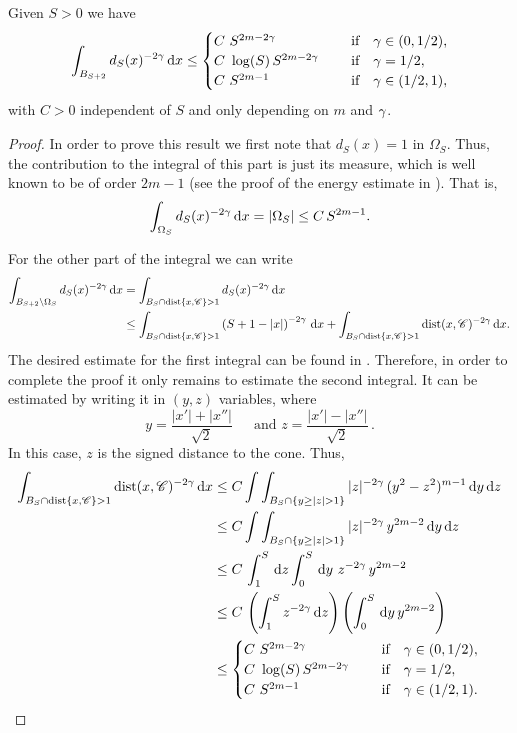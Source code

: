 \begin{lemma}
\label{Lemma:Integrability_dFunction}
Given $S>0$ we have
$$ \int_{B_{S+2}} d_S(x)^{-2\gamma} \,\mathrm{d} x \leq \begin{cases}
C \ S^{2m-2\gamma}\ \ \ \ &\textrm{if } \ \ \gamma\in(0,1/2),\\
C\ \log(S)\,S^{2m-2\gamma}\ \ \ \ &\textrm{if } \ \ \gamma=1/2,\\
C \ S^{2m-1}\ \ \ \ &\textrm{if } \ \ \gamma\in(1/2,1),\\
\end{cases} $$
with $C>0$ independent of $S$ and only depending on $m$ and $\gamma$.
\end{lemma}

\begin{proof}
In order to prove this result we first note that $d_S(x)=1$ in $\Omega_S$. Thus, the contribution to the integral of this part is just its measure, which is well known to be of order $2m-1$ (see the proof of the energy estimate in \cite{CabreTerraI}). That is,
$$\int_{\Omega_S} d_S(x)^{-2\gamma} \,\mathrm{d} x = |\Omega_S| \leq C\,S^{2m-1}.$$

For the other part of the integral we can write
\begin{align*}
\int_{B_{S+2}\setminus \Omega_S} d_S(x)^{-2\gamma} \,\mathrm{d} x &= \int_{B_{S}\cap \operatorname{dist}\{x,\mathscr{C}\}>1} d_S(x)^{-2\gamma} \,\mathrm{d} x \\
& \leq \int_{B_{S}\cap \operatorname{dist}\{x,\mathscr{C}\}>1} \left( S+1-|x| \right)^{-2\gamma} \,\mathrm{d} x + \int_{B_{S}\cap \operatorname{dist}\{x,\mathscr{C}\}>1} \operatorname{dist}(x,\mathscr{C})^{-2\gamma} \,\mathrm{d} x.
\end{align*}
The desired estimate for the first integral can be found in \cite{SavinValdinoci-EnergyEstimate}. Therefore, in order to complete the proof it only remains to estimate the second integral. It can be estimated by writing it in $(y,z)$ variables, where
$$
y = \dfrac{|x'|+|x''|}{\sqrt{2}} \, \quad \text{ and } z = \dfrac{|x'|-|x''|}{\sqrt{2}}\,.
$$
In this case, $z$ is the signed distance to the cone. Thus,
\begin{align*}
\int_{B_{S}\cap \dist\{x,\ccal\}>1} \dist(x,\ccal)^{-2\s} \d x &\leq C \int \int_{B_{S}\cap \{y\geq|z|>1\}} |z|^{-2\s} \, (y^2-z^2)^{m-1} \d y\d z \\
& \leq C \int \int_{B_{S}\cap \{y\geq|z|>1\}} |z|^{-2\s} \, y^{2m-2} \d y\d z \\
& \leq C\, \int_1^S \d z \int_0^S \d y\ z^{-2\s} \, y^{2m-2} \\
& \leq C\, \left(\int_1^S z^{-2\s} \d z \right)  \left(  \int_0^S \d y \, y^{2m-2} \right) \\
& \leq \begin{cases}
C \ S^{2m-2\s}\ \ \ \ &\textrm{if } \ \ \s\in(0,1/2),\\
C\ \log(S)\,S^{2m-2\s}\ \ \ \ &\textrm{if } \ \ \s=1/2,\\
C \ S^{2m-1}\ \ \ \ &\textrm{if } \ \ \s\in(1/2,1).\\
\end{cases}
\end{align*}
\end{proof}


